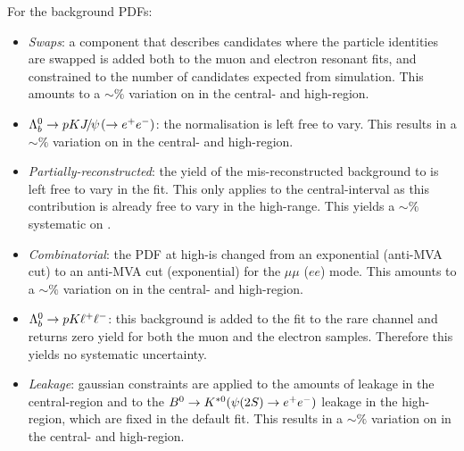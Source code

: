 For the background PDFs:
%
\begin{itemize}

\item \textit{Swaps}: a component that describes candidates where the particle identities are swapped
is added both to the muon and electron resonant fits, and constrained to the number of candidates
expected from simulation. This amounts to a $\sim \%$ variation on \RKst in the central- and high-\qsq region.

\item $\Lb\to pK\jpsi(\to \ee)$: the normalisation is left free to vary.
This results in a $\sim \%$ variation on \RKst in the central- and high-\qsq region.


\item \textit{Partially-reconstructed}: the yield of the mis-reconstructed background to \BdToKstee is left free to vary in the fit.
This only applies to the central-\qsq interval as this contribution is already free to vary in the high-\qsq range.
This yields a $\sim \%$ systematic on \RKst.

\item \textit{Combinatorial}: the PDF at high-\qsq is changed from an exponential (anti-MVA cut) to an anti-MVA
cut (exponential) for the $\mu\mu$ ($ee$) mode. This amounts to a $\sim \%$ variation on \RKst in the central- and high-\qsq region.

\item ${{\Lambda}^0_{b}}\rightarrow pK \ell^+ \ell^-$: this background is added to the fit to the rare channel and returns zero yield for both the muon and the electron samples.
Therefore this yields no systematic uncertainty.

\item \textit{Leakage}: gaussian constraints are applied to the amounts of \BdToKstJPsee leakage in the central-\qsq region
 and to the $\Bz\to\Kstarz(\psitwos\to \ee)$ leakage in the high-\qsq region, which are fixed in the default fit.
This results in a $\sim \%$ variation on \RKst in the central- and high-\qsq region.

\end{itemize}


